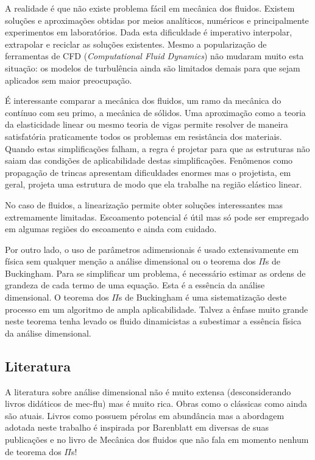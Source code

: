 \documentclass[article,12pt,oneside,a4paper,english,brazil,sumario=tradicional]{abntex2}
\begin{document}
A realidade é que não existe problema fácil em mecânica dos fluidos. Existem soluções e aproximações obtidas por meios analíticos, numéricos e principalmente experimentos em laboratórios. Dada esta dificuldade é imperativo interpolar, extrapolar e reciclar as soluções existentes. Mesmo a popularização de ferramentas de CFD (\emph{Computational Fluid Dynamics}) não mudaram muito esta situação: os modelos de turbulência ainda são limitados demais para que sejam aplicados sem maior preocupação.

É interessante comparar a mecânica dos fluidos, um ramo da mecânica do contínuo com seu primo, a mecânica de sólidos. Uma aproximação como a teoria da elasticidade linear ou mesmo teoria de vigas permite resolver de maneira satisfatória praticamente todos os problemas em resistância dos materiais. Quando estas simplificações falham, a regra é projetar para que as estruturas não saiam das condições de aplicabilidade destas simplificações. Fenômenos como propagação de trincas apresentam dificuldades enormes mas o projetista, em geral, projeta uma estrutura de modo que ela trabalhe na região elástico linear.

No caso de fluidos, a linearização permite obter soluções interessantes mas extremamente limitadas. Escoamento potencial é útil mas só pode ser empregado em algumas regiões do escoamento e ainda com cuidado.

Por outro lado, o uso de parâmetros adimensionais é usado extensivamente em física sem qualquer menção a análise dimensional ou o teorema dos $\Pi$s de Buckingham. Para se simplificar um problema, é necessário estimar as ordens de grandeza de cada termo de uma equação. Esta é a essência da análise dimensional. O teorema dos $\Pi$s de Buckingham é uma sistematização deste processo em um algoritmo de ampla aplicabilidade. Talvez a ênfase muito grande neste teorema tenha levado os fluido dinamicistas a subestimar a essência física da análise dimensional.

\subsection{Literatura}
A literatura sobre análise dimensional não é muito extensa (desconsiderando livros didáticos de mec-flu) mas é muito rica. Obras como o clássicas como   ainda são atuais. Livros como  possuem pérolas em abundância mas a abordagem adotada neste trabalho é inspirada por Barenblatt em diversas de suas publicações \cite{Barenblatt03} e no livro de Mecânica dos fluidos  que não fala em momento nenhum de teorema dos $\Pi$s!
\end{document}
